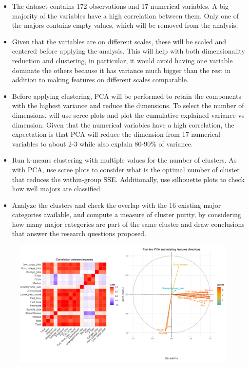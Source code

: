 \documentclass[11pt]{article}
\begin{document}
\begin{itemize}[leftmargin=*]
    \item The dataset contains 172 observations and 17 numerical variables. A big majority of the variables have a high correlation between them. Only one of the majors contains empty values, which will be removed from the analysis.
    \item Given that the variables are on different scales, these will be scaled and centered before applying the analysis. This will help with both dimensionality reduction and clustering, in particular, it would avoid having one variable dominate the others because it has variance much bigger than the rest in addition to making features on different scales comparable.
    \item Before applying clustering, PCA will be performed to retain the components with the highest variance and reduce the dimensions. To select the number of dimensions, will use scree plots and plot the cumulative explained variance vs dimension. Given that the numerical variables have a high correlation, the expectation is that PCA will reduce the dimension from 17 numerical variables to about 2-3 while also explain 80-90\% of variance.
    \item Run k-means clustering with multiple values for the number of clusters. As with PCA, use scree plots to consider what is the optimal number of cluster that reduces the within-group SSE. Additionally, use silhouette plots to check how well majors are classified.
    \item Analyze the clusters and check the overlap with the 16 existing major categories available, and compute a measure of cluster purity, by considering how many major categories are part of the same cluster and draw conclusions that answer the research questions proposed.
\end{itemize}

\begin{figure} [H]
    \begin{center}
        \includegraphics[scale=1, width=18cm]{plots.png}
        \label{fig:sampledvsdata}
    \end{center}
\end{figure}
\end{document}
